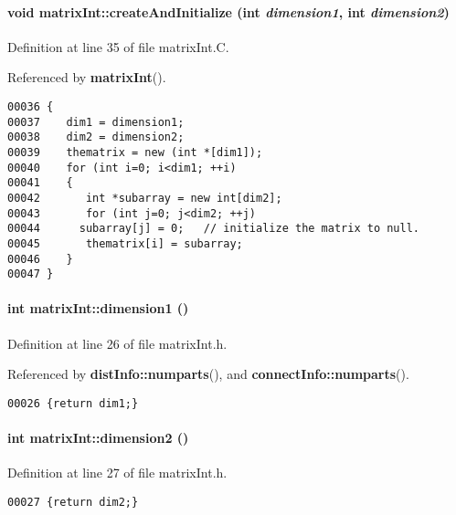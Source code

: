 \paragraph{\setlength{\rightskip}{0pt plus 5cm}void matrix\-Int::create\-And\-Initialize (int {\em dimension1}, int {\em dimension2})\hspace{0.3cm}{\tt  [private]}}\hfill



Definition at line 35 of file matrix\-Int.C.

Referenced by {\bf matrix\-Int}().\small\begin{verbatim}00036 {
00037    dim1 = dimension1;
00038    dim2 = dimension2;
00039    thematrix = new (int *[dim1]);
00040    for (int i=0; i<dim1; ++i)
00041    {
00042       int *subarray = new int[dim2];
00043       for (int j=0; j<dim2; ++j)
00044      subarray[j] = 0;   // initialize the matrix to null.
00045       thematrix[i] = subarray;
00046    }
00047 }
\end{verbatim}\normalsize 
\label{matrixInt_a4}
\paragraph{\setlength{\rightskip}{0pt plus 5cm}int matrix\-Int::dimension1 ()\hspace{0.3cm}{\tt  [inline]}}\hfill



Definition at line 26 of file matrix\-Int.h.

Referenced by {\bf dist\-Info::numparts}(), and {\bf connect\-Info::numparts}().\small\begin{verbatim}00026 {return dim1;}
\end{verbatim}\normalsize 
\label{matrixInt_a5}
\paragraph{\setlength{\rightskip}{0pt plus 5cm}int matrix\-Int::dimension2 ()\hspace{0.3cm}{\tt  [inline]}}\hfill



Definition at line 27 of file matrix\-Int.h.\small\begin{verbatim}00027 {return dim2;}
\end{verbatim}\normalsize 
\label{matrixInt_a7}
